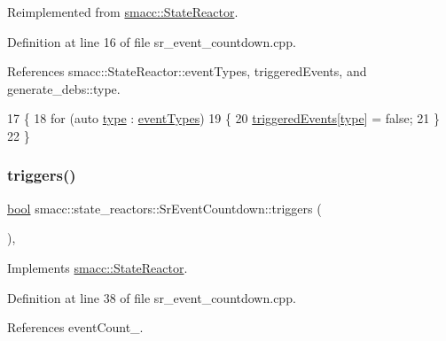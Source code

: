 Reimplemented from \hyperlink{classsmacc_1_1StateReactor_aa10b2c6b7d1e80f01b00cbdac526a2bf}{smacc\+::\+State\+Reactor}.



Definition at line 16 of file sr\+\_\+event\+\_\+countdown.\+cpp.



References smacc\+::\+State\+Reactor\+::event\+Types, triggered\+Events, and generate\+\_\+debs\+::type.


\begin{DoxyCode}
17 \{
18     \textcolor{keywordflow}{for} (\textcolor{keyword}{auto} \hyperlink{namespacegenerate__debs_a50bc9a7ecac9584553e089a448bcde58}{type} : \hyperlink{classsmacc_1_1StateReactor_a65c8ddfce40e7859e5c73fff1cf6c04b}{eventTypes})
19     \{
20         \hyperlink{classsmacc_1_1state__reactors_1_1SrEventCountdown_a6f9b3a51e8e8becbf76f99a5d0bcb8c5}{triggeredEvents}[\hyperlink{namespacegenerate__debs_a50bc9a7ecac9584553e089a448bcde58}{type}] = \textcolor{keyword}{false};
21     \}
22 \}
\end{DoxyCode}
\mbox{\label{classsmacc_1_1state__reactors_1_1SrEventCountdown_aff678113dbd07339e5e3736e4aa00c81}} 
\subsubsection{\texorpdfstring{triggers()}{triggers()}}
{\footnotesize\ttfamily \hyperlink{classbool}{bool} smacc\+::state\+\_\+reactors\+::\+Sr\+Event\+Countdown\+::triggers (\begin{DoxyParamCaption}{ }\end{DoxyParamCaption})\hspace{0.3cm}{\ttfamily [override]}, {\ttfamily [virtual]}}



Implements \hyperlink{classsmacc_1_1StateReactor_a445bc3c90980d75d7d815b85cfb68b21}{smacc\+::\+State\+Reactor}.



Definition at line 38 of file sr\+\_\+event\+\_\+countdown.\+cpp.



References event\+Count\+\_\+.


